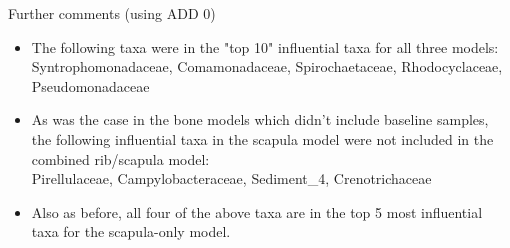 \documentclass{beamer}
\begin{document}
\begin{frame}{Further comments (using ADD 0)}
  
  \begin{itemize}
    \item The following taxa were in the "top 10" influential taxa for all
    three models:\\
    Syntrophomonadaceae, Comamonadaceae, Spirochaetaceae, Rhodocyclaceae, 
    Pseudomonadaceae
    \item As was the case in the bone models which didn't include baseline
    samples, the following influential taxa in the scapula model were not
    included in the combined rib/scapula model:\\
    Pirellulaceae, Campylobacteraceae, Sediment\_4, Crenotrichaceae
    \item Also as before, all four of the above taxa are in the top 5 most
    influential taxa for the scapula-only model.
    
  \end{itemize}

\end{frame}
\end{document}
